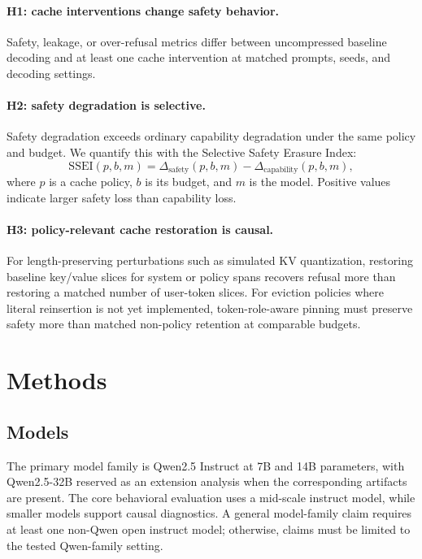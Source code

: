 \documentclass[11pt]{article}
\newcommand{\ssei}{\mathrm{SSEI}}
\begin{document}
\paragraph{H1: cache interventions change safety behavior.}
Safety, leakage, or over-refusal metrics differ between uncompressed baseline decoding and at least one cache intervention at matched prompts, seeds, and decoding settings.

\paragraph{H2: safety degradation is selective.}
Safety degradation exceeds ordinary capability degradation under the same policy and budget. We quantify this with the Selective Safety Erasure Index:
\begin{equation}
  \ssei(p, b, m) =
  \Delta_{\text{safety}}(p,b,m) -
  \Delta_{\text{capability}}(p,b,m),
\end{equation}
where $p$ is a cache policy, $b$ is its budget, and $m$ is the model. Positive values indicate larger safety loss than capability loss.

\paragraph{H3: policy-relevant cache restoration is causal.}
For length-preserving perturbations such as simulated KV quantization, restoring baseline key/value slices for system or policy spans recovers refusal more than restoring a matched number of user-token slices. For eviction policies where literal reinsertion is not yet implemented, token-role-aware pinning must preserve safety more than matched non-policy retention at comparable budgets.

\section{Methods}

\subsection{Models}

The primary model family is Qwen2.5 Instruct at 7B and 14B parameters, with Qwen2.5-32B reserved as an extension analysis when the corresponding artifacts are present. The core behavioral evaluation uses a mid-scale instruct model, while smaller models support causal diagnostics. A general model-family claim requires at least one non-Qwen open instruct model; otherwise, claims must be limited to the tested Qwen-family setting.
\end{document}
